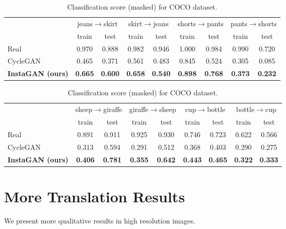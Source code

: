 \documentclass{article} \usepackage{iclr2019_conference,times}
\begin{document}
\begin{table}[H]
\caption{
Classification score for CCP dataset.
} \label{tab:cls-ccp}
\centering
\begin{tabular}{lcccc|cccc}
	\toprule
	& \multicolumn{2}{c}{jeans$\to$skirt} & \multicolumn{2}{c}{skirt$\to$jeans} & \multicolumn{2}{|c}{shorts$\to$pants} & \multicolumn{2}{c}{pants$\to$shorts} \\
	\cmidrule{2-5} \cmidrule{6-9}
	& train & test & train & test & train & test & train & test \\
	\midrule
	Real & 0.970 & 0.888 & 0.982 & 0.946 & 1.000 & 0.984 & 0.990 & 0.720 \\
	\midrule
	CycleGAN & 0.465 & 0.371 & 0.561 & 0.483 & 0.845 & 0.524 & 0.305 & 0.085 \\
	\textbf{InstaGAN (ours)} & \textbf{0.665} & \textbf{0.600} & \textbf{0.658} & \textbf{0.540} & \textbf{0.898} & \textbf{0.768} & \textbf{0.373} & \textbf{0.232} \\
	\bottomrule
\end{tabular}
\vspace{0.1in}
\caption{
Classification score (masked) for COCO dataset.
} \label{tab:cls-coco}
\begin{tabular}{lcccc|cccc}
	\toprule
    & \multicolumn{2}{c}{sheep$\to$giraffe} & \multicolumn{2}{c}{giraffe$\to$sheep} & \multicolumn{2}{|c}{cup$\to$bottle} & \multicolumn{2}{c}{bottle$\to$cup} \\
	\cmidrule{2-5} \cmidrule{6-9}
	& train & test & train & test & train & test & train & test \\
	\midrule
	Real & 0.891 & 0.911 & 0.925 & 0.930 & 0.746 & 0.723 & 0.622 & 0.566 \\
	\midrule
	CycleGAN & 0.313 & 0.594 & 0.291 & 0.512 & 0.368 & 0.403 & 0.290 & 0.275 \\
	\textbf{InstaGAN (ours)} & \textbf{0.406} & \textbf{0.781} & \textbf{0.355} & \textbf{0.642} & \textbf{0.443} & \textbf{0.465} & \textbf{0.322} & \textbf{0.333} \\
	\bottomrule
\end{tabular}
\end{table}


\section{More Translation Results}
\label{sec:more-results}

We present more qualitative results in high resolution images.
\end{document}
